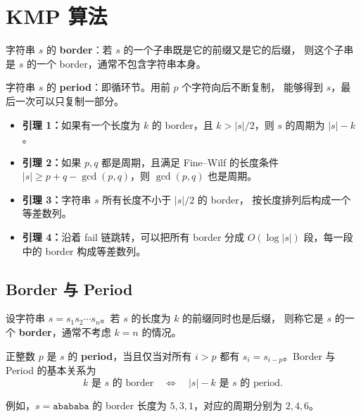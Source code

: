 \section{KMP 算法}

\par\noindent
字符串 $s$ 的 \textbf{border}：若 $s$ 的一个子串既是它的前缀又是它的后缀，
则这个子串是 $s$ 的一个 border，通常不包含字符串本身。

\par\noindent
字符串 $s$ 的 \textbf{period}：即循环节。用前 $p$ 个字符向后不断复制，
能够得到 $s$，最后一次可以只复制一部分。

\begin{itemize}
    \item \textbf{引理 1：}如果有一个长度为 $k$ 的 border，且
    $k>|s|/2$，则 $s$ 的周期为 $|s|-k$。
    \item \textbf{引理 2：}如果 $p,q$ 都是周期，且满足 Fine--Wilf 的长度条件
    $|s|\ge p+q-\gcd(p,q)$，则 $\gcd(p,q)$ 也是周期。
    \item \textbf{引理 3：}字符串 $s$ 所有长度不小于 $|s|/2$ 的 border，
    按长度排列后构成一个等差数列。
    \item \textbf{引理 4：}沿着 fail 链跳转，可以把所有 border 分成
    $O(\log |s|)$ 段，每一段中的 border 构成等差数列。
\end{itemize}

\subsection{Border 与 Period}

设字符串 $s=s_1s_2\cdots s_n$。若 $s$ 的长度为 $k$ 的前缀同时也是后缀，
则称它是 $s$ 的一个 \textbf{border}，通常不考虑 $k=n$ 的情况。

正整数 $p$ 是 $s$ 的 \textbf{period}，当且仅当对所有 $i>p$ 都有
$s_i=s_{i-p}$。Border 与 Period 的基本关系为
\[
    k\text{ 是 }s\text{ 的 border}
    \quad\Longleftrightarrow\quad
    |s|-k\text{ 是 }s\text{ 的 period}.
\]

例如，$s=\texttt{abababa}$ 的 border 长度为 $5,3,1$，对应的周期分别为
$2,4,6$。

